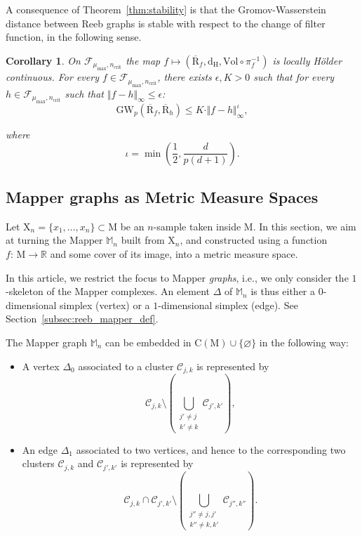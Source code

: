 \documentclass[pdflatex,sn-mathphys-ay]{sn-jnl}%
\newtheorem{corollary}{Corollary}[theorem]
\newcommand{\reeb}{\mathrm{R}}
\newcommand{\man}{\mathrm{M}}
\newcommand{\sample}{\mathrm{X}}
\newcommand{\cluster}{\mathcal{C}}
\newcommand{\gromov}{\mathrm{GW}}
\newcommand{\comp}{{\mathrm {C}}}
\newcommand{\haus}{{\mathrm {d_H}}}
\newcommand{\mapper}{{\mathbb{M}_n}}
\newcommand{\simp}{\Delta}
\newcommand{\vol}{\mathrm{Vol}}
\newcommand{\R}{\mathbb{R}}
\newcommand{\mub}{{\mu_{\text{max}}}}
\newcommand{\crib}{{n_{\text{crit}}}}
\newcommand{\class}{\mathcal{F}_{\mub,\crib}}
\newcommand{\inorm}[1]{\Vert #1\Vert_\infty}
\newcommand{\change}[1]{\noindent #1}
\newcommand{\ff}{h}
\theoremstyle{thmstyleone}%
\begin{document}
A consequence of Theorem~\ref{thm:stability} is that the Gromov-Wasserstein distance between Reeb graphs is stable with respect to the change of filter function, in the following sense.

\begin{corollary}\label{cor:holder}
On $\class$ the map $f\mapsto\left(\overline{\reeb}_f,\haus,\vol\circ\pi_f^{-1}\right)$ is locally H\"{o}lder continuous. For every $f\in\class$, there exists $\epsilon,K>0$ such that for every $\ff\in\class$ such that $\inorm{f-\ff}\leq\epsilon$:
$$\gromov_p(\overline{\reeb}_f,\overline{\reeb}_\ff)\leq K\cdot\inorm{f-\ff}^\iota,$$

where $$\iota=\min\left(\frac{1}{2},\frac{d}{p(d+1)}\right).$$


\end{corollary}




%
\subsection{\change{Mapper graphs as Metric Measure Spaces}}\label{sec:mapper_mms}


Let $\sample_n= \{x_1,\dots,x_n\}\subset \man$ be an $n$-sample taken inside $\man$. In this section, we aim at turning the Mapper $\mapper$ built from $\sample_n$, and constructed using a function $f\colon\,\man\rightarrow\R$ and some cover of its image, into a metric measure space. 

In this article, we restrict the focus to Mapper {\em graphs}, i.e., we only consider the $1$-skeleton of the Mapper complexes. 
An element $\simp$ of $\mapper$ is thus either a $0$-dimensional simplex (vertex) or a $1$-dimensional simplex (edge). See Section~\ref{subsec:reeb_mapper_def}. 

The Mapper graph $\mapper$ can be embedded in $\comp(\man)\cup\{\varnothing\}$ in the following way:

 \begin{itemize}
     \item A vertex $\simp_0$ associated to a cluster $\cluster_{j,k}$ is represented by $$\cluster_{j,k}\setminus \left(\bigcup_{\substack{j'\neq j \\k'\neq k}}\cluster_{j',k'}\right),$$
     \item An edge $\simp_1$ associated to two vertices, and hence to the corresponding two clusters $\cluster_{j,k}$ and $\cluster_{j',k'}$ is represented by $$\cluster_{j,k}\cap \cluster_{j',k'}\setminus\left(\bigcup_{\substack{j''\neq j,j' \\k''\neq k,k'}}\cluster_{j'',k''}\right).$$
 \end{itemize}
 
\end{document}
